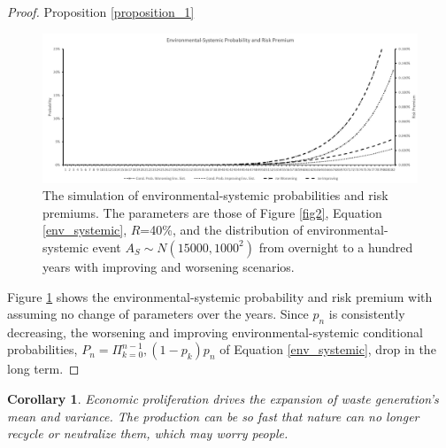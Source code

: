 \documentclass[sn-basic]{sn-jnl}%
\theoremstyle{thmstyleone}%
\newtheorem{corollary}[theorem]{Corollary}
\theoremstyle{thmstyletwo}%
\theoremstyle{thmstylethree}%
\begin{document}
\begin{proof}{Proposition \ref{proposition_1}}
	\begin{figure}[h!]
		\centering
		\includegraphics[width=1.0\textwidth]{Fig4_BW}
		\caption{The simulation of environmental-systemic probabilities and risk premiums. The parameters are those of Figure \ref{fig2}, Equation \ref{env_systemic}, $R$=40\%, and the distribution of environmental-systemic event $A_S\sim N\left(15000,1000^2\right)$ from overnight to a hundred years with improving and worsening scenarios.}
		\label{fig3b}
	\end{figure}
	Figure \ref{fig3b} shows the environmental-systemic probability and risk premium with assuming no change of parameters over the years. Since $p_{n}$ is consistently decreasing, the worsening and improving environmental-systemic conditional probabilities, $P_n=\Pi_{k=0}^{n-1},\left(1-p_{k}\right)p_{n}$ of Equation \ref{env_systemic}, drop in the long term.
\end{proof}

\begin{corollary}
	\label{corollary1}
	Economic proliferation drives the expansion of waste generation’s mean and variance. The production can be so fast that nature can no longer recycle or neutralize them, which may worry people. 
\end{corollary}
\end{document}
